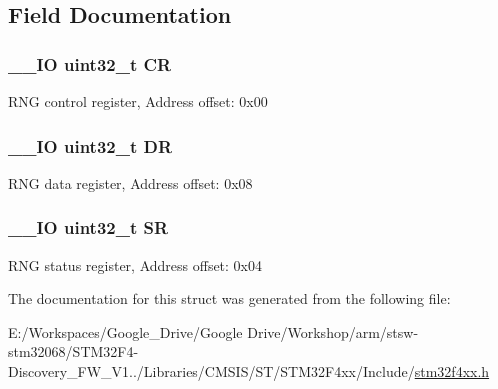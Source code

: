\subsection{Field Documentation}
\hypertarget{struct_r_n_g___type_def_ab40c89c59391aaa9d9a8ec011dd0907a}{
\subsubsection[{C\-R}]{\setlength{\rightskip}{0pt plus 5cm}\-\_\-\-\_\-\-I\-O uint32\-\_\-t C\-R}}\label{struct_r_n_g___type_def_ab40c89c59391aaa9d9a8ec011dd0907a}
R\-N\-G control register, Address offset\-: 0x00 \hypertarget{struct_r_n_g___type_def_a3df0d8dfcd1ec958659ffe21eb64fa94}{
\subsubsection[{D\-R}]{\setlength{\rightskip}{0pt plus 5cm}\-\_\-\-\_\-\-I\-O uint32\-\_\-t D\-R}}\label{struct_r_n_g___type_def_a3df0d8dfcd1ec958659ffe21eb64fa94}
R\-N\-G data register, Address offset\-: 0x08 \hypertarget{struct_r_n_g___type_def_af6aca2bbd40c0fb6df7c3aebe224a360}{
\subsubsection[{S\-R}]{\setlength{\rightskip}{0pt plus 5cm}\-\_\-\-\_\-\-I\-O uint32\-\_\-t S\-R}}\label{struct_r_n_g___type_def_af6aca2bbd40c0fb6df7c3aebe224a360}
R\-N\-G status register, Address offset\-: 0x04 

The documentation for this struct was generated from the following file\-:\begin{DoxyCompactItemize}
\item 
E\-:/\-Workspaces/\-Google\-\_\-\-Drive/\-Google Drive/\-Workshop/arm/stsw-\/stm32068/\-S\-T\-M32\-F4-\/\-Discovery\-\_\-\-F\-W\-\_\-\-V1../\-Libraries/\-C\-M\-S\-I\-S/\-S\-T/\-S\-T\-M32\-F4xx/\-Include/\hyperlink{stm32f4xx_8h}{stm32f4xx.\-h}\end{DoxyCompactItemize}

